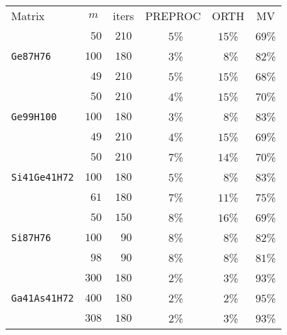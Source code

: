 \begin{tabular}{l|c|c|c|c|c}
\hline
\multirow{2}{*}{Matrix} & \multirow{2}{*}{$m$} & \multirow{2}{*}{iters} & \multirow{2}{*}{PREPROC} & \multirow{2}{*}{ORTH} & \multirow{2}{*}{MV} \\
 & & & & & \\\hline
\hline
  & $\phantom{0}50$ & $210$ & $\phantom{0}5$\% & $15$\% & $69$\%\\
\verb|Ge87H76| & $100$ & $180$ & $\phantom{0}3$\% & $\phantom{0}8$\% & $82$\%\\
  & $\phantom{0}49$ & $210$ & $\phantom{0}5$\% & $15$\% & $68$\%\\\hline
  & $\phantom{0}50$ & $210$ & $\phantom{0}4$\% & $15$\% & $70$\%\\
\verb|Ge99H100| & $100$ & $180$ & $\phantom{0}3$\% & $\phantom{0}8$\% & $83$\%\\
  & $\phantom{0}49$ & $210$ & $\phantom{0}4$\% & $15$\% & $69$\%\\\hline
  & $\phantom{0}50$ & $210$ & $\phantom{0}7$\% & $14$\% & $70$\%\\
\verb|Si41Ge41H72| & $100$ & $180$ & $\phantom{0}5$\% & $\phantom{0}8$\% & $83$\%\\
  & $\phantom{0}61$ & $180$ & $\phantom{0}7$\% & $11$\% & $75$\%\\\hline
  & $\phantom{0}50$ & $150$ & $\phantom{0}8$\% & $16$\% & $69$\%\\
\verb|Si87H76| & $100$ & $\phantom{0}90$ & $\phantom{0}8$\% & $\phantom{0}8$\% & $82$\%\\
  & $\phantom{0}98$ & $\phantom{0}90$ & $\phantom{0}8$\% & $\phantom{0}8$\% & $81$\%\\\hline
  & $300$ & $180$ & $\phantom{0}2$\% & $\phantom{0}3$\% & $93$\%\\
\verb|Ga41As41H72| & $400$ & $180$ & $\phantom{0}2$\% & $\phantom{0}2$\% & $95$\%\\
  & $308$ & $180$ & $\phantom{0}2$\% & $\phantom{0}3$\% & $93$\%\\\hline
\end{tabular}